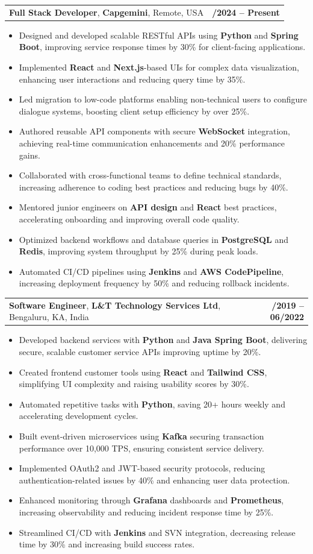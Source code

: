 \documentclass[letterpaper,11pt]{article}
\makeatletter
\newcommand{\resumeItem}[1]{
  \item\footnotesize{
    {#1 \vspace{-2pt}}
  }
}
\newcommand{\resumeSubheading}[4]{
  \vspace{-2pt}\item
    \begin{tabular*}{1.0\textwidth}[t]{l@{\extracolsep{\fill}}r}
      \textbf{\fontsize{10pt}{14pt}\selectfont #3}, \textbf{\fontsize{10pt}{14pt}\selectfont #1}, \fontsize{10pt}{14pt}\selectfont #4 & \textbf{\fontsize{10pt}{14pt}\selectfont #2} \\
    \end{tabular*}\vspace{-7pt}
}
\newcommand{\resumeItemListStart}{\begin{itemize}[leftmargin=*]}
\newcommand{\resumeItemListEnd}{\end{itemize}\vspace{-5pt}}
\makeatother
\begin{document}
    \resumeSubheading
        {Capgemini}{01/2024 -- Present}
        {Full Stack Developer}{Remote, USA}
      \resumeItemListStart
        \resumeItem{Designed and developed scalable RESTful APIs using \textbf{Python} and \textbf{Spring Boot}, improving service response times by 30\% for client-facing applications.}
        \resumeItem{Implemented \textbf{React} and \textbf{Next.js}-based UIs for complex data visualization, enhancing user interactions and reducing query time by 35\%.}
        \resumeItem{Led migration to low-code platforms enabling non-technical users to configure dialogue systems, boosting client setup efficiency by over 25\%.}
        \resumeItem{Authored reusable API components with secure \textbf{WebSocket} integration, achieving real-time communication enhancements and 20\% performance gains.}
        \resumeItem{Collaborated with cross-functional teams to define technical standards, increasing adherence to coding best practices and reducing bugs by 40\%.}
        \resumeItem{Mentored junior engineers on \textbf{API design} and \textbf{React} best practices, accelerating onboarding and improving overall code quality.}
        \resumeItem{Optimized backend workflows and database queries in \textbf{PostgreSQL} and \textbf{Redis}, improving system throughput by 25\% during peak loads.}
        \resumeItem{Automated CI/CD pipelines using \textbf{Jenkins} and \textbf{AWS CodePipeline}, increasing deployment frequency by 50\% and reducing rollback incidents.}
      \resumeItemListEnd

    \resumeSubheading
        {L\&T Technology Services Ltd}{08/2019 -- 06/2022}
        {Software Engineer}{Bengaluru, KA, India}
      \resumeItemListStart
        \resumeItem{Developed backend services with \textbf{Python} and \textbf{Java Spring Boot}, delivering secure, scalable customer service APIs improving uptime by 20\%.}
        \resumeItem{Created frontend customer tools using \textbf{React} and \textbf{Tailwind CSS}, simplifying UI complexity and raising usability scores by 30\%.}
        \resumeItem{Automated repetitive tasks with \textbf{Python}, saving 20+ hours weekly and accelerating development cycles.}
        \resumeItem{Built event-driven microservices using \textbf{Kafka} securing transaction performance over 10,000 TPS, ensuring consistent service delivery.}
        \resumeItem{Implemented OAuth2 and JWT-based security protocols, reducing authentication-related issues by 40\% and enhancing user data protection.}
        \resumeItem{Enhanced monitoring through \textbf{Grafana} dashboards and \textbf{Prometheus}, increasing observability and reducing incident response time by 25\%.}
        \resumeItem{Streamlined CI/CD with \textbf{Jenkins} and SVN integration, decreasing release time by 30\% and increasing build success rates.}
      \resumeItemListEnd
\end{document}
